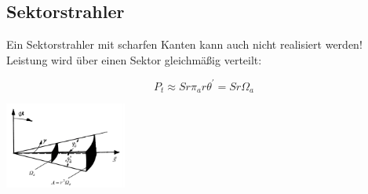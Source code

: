 \documentclass[english]{latex4ei/latex4ei_sheet}
\begin{document}
\begin{sectionbox}
\subsection{Sektorstrahler}
Ein Sektorstrahler mit scharfen Kanten kann auch nicht realisiert werden!
Leistung wird über einen Sektor gleichmäßig verteilt:

$$P_t \approx S r \pi_{a} r \theta^{'} = S r \Omega_{a}$$

\begin{center}\includegraphics[width = 4cm]{./img/antennen_sektor_strahler.png}
\end{center}
\end{sectionbox}
\end{document}
